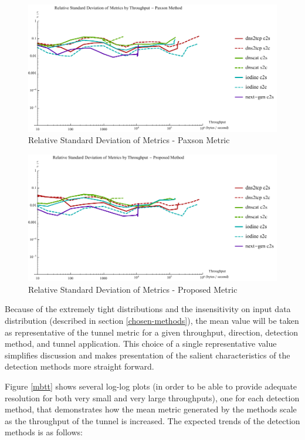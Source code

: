 \documentclass[12pt]{report}
\theoremstyle{remark}
\theoremstyle{definition}
\theoremstyle{definition}
\theoremstyle{definition}
\begin{document}
\begin{figure}
\centering
\includegraphics[width=\textwidth]{figures/rsd-paxson.pdf}
\caption[Relative Standard Deviation of Metrics - Paxson Metric]{Relative Standard Deviation of Metrics - Paxson Metric}
\label{rsd-paxson}
\end{figure}

\begin{figure}
\centering
\includegraphics[width=\textwidth]{figures/rsd-proposed.pdf}
\caption[Relative Standard Deviation of Metrics - Proposed Metric]{Relative Standard Deviation of Metrics - Proposed Metric}
\label{rsd-proposed}
\end{figure}

Because of the extremely tight distributions and the insensitivity on input data
distribution (described in section \ref{chosen-methods}), the mean value will be
taken as representative of the tunnel metric for a given throughput, direction,
detection method, and tunnel application. This choice of a single representative
value simplifies discussion and makes presentation of the salient
characteristics of the detection methods more straight forward.

Figure \ref{mbtt} shows several log-log plots (in order to be able to provide
adequate resolution for both very small and very large throughputs), one for
each detection method, that demonstrates how the mean metric generated by the
methods scale as the throughput of the tunnel is increased. The expected trends
of the detection methods is as follows:
\end{document}
